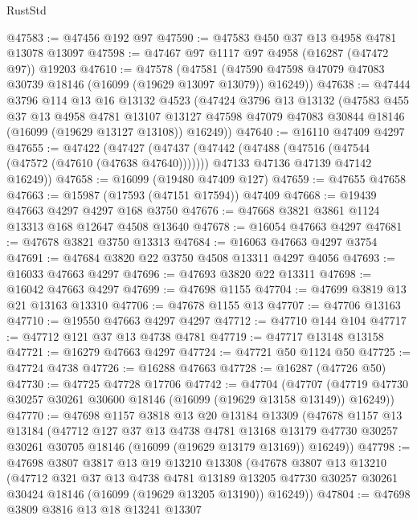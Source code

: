 \begin{lexlean}{RustStd}
\begin{coremodule}
@47583 := @47456 @192 @97
@47590 := @47583 @450 @37 @13 @4958 @4781 @13078 @13097
@47598 := @47467 @97 @1117 @97 @4958 (@16287 (@47472 @97)) @19203
@47610 := @47578
    (@47581 (@47590 @47598 @47079 @47083 @30739 @18146 (@16099 (@19629 @13097 @13079)) @16249))
@47638 := @47444
    @3796
    @114
    @13
    @16
    @13132
    @4523
    (@47424
      @3796
      @13
      @13132
      (@47583
        @455
        @37
        @13
        @4958
        @4781
        @13107
        @13127
        @47598
        @47079
        @47083
        @30844
        @18146
        (@16099 (@19629 @13127 @13108))
        @16249))
@47640 := @16110 @47409 @4297
@47655 := @47422
    (@47427
      (@47437
        (@47442 (@47488 (@47516 (@47544 (@47572 (@47610 (@47638 @47640)))))))
        @47133
        @47136
        @47139
        @47142
        @16249))
@47658 := @16099 (@19480 @47409 @127)
@47659 := @47655 @47658
@47663 := @15987 (@17593 (@47151 @17594)) @47409
@47668 := @19439 @47663 @4297 @4297 @168 @3750
@47676 := @47668 @3821 @3861 @1124 @13313 @168 @12647 @4508 @13640
@47678 := @16054 @47663 @4297
@47681 := @47678 @3821 @3750 @13313
@47684 := @16063 @47663 @4297 @3754
@47691 := @47684 @3820 @22 @3750 @4508 @13311 @4297 @4056
@47693 := @16033 @47663 @4297
@47696 := @47693 @3820 @22 @13311
@47698 := @16042 @47663 @4297
@47699 := @47698 @1155
@47704 := @47699 @3819 @13 @21 @13163 @13310
@47706 := @47678 @1155 @13
@47707 := @47706 @13163
@47710 := @19550 @47663 @4297 @4297
@47712 := @47710 @144 @104
@47717 := @47712 @121 @37 @13 @4738 @4781
@47719 := @47717 @13148 @13158
@47721 := @16279 @47663 @4297
@47724 := @47721 @50 @1124 @50
@47725 := @47724 @4738
@47726 := @16288 @47663
@47728 := @16287 (@47726 @50)
@47730 := @47725 @47728 @17706
@47742 := @47704
    (@47707 (@47719 @47730 @30257 @30261 @30600 @18146 (@16099 (@19629 @13158 @13149)) @16249))
@47770 := @47698
    @1157
    @3818
    @13
    @20
    @13184
    @13309
    (@47678
      @1157
      @13
      @13184
      (@47712
        @127
        @37
        @13
        @4738
        @4781
        @13168
        @13179
        @47730
        @30257
        @30261
        @30705
        @18146
        (@16099 (@19629 @13179 @13169))
        @16249))
@47798 := @47698
    @3807
    @3817
    @13
    @19
    @13210
    @13308
    (@47678
      @3807
      @13
      @13210
      (@47712
        @321
        @37
        @13
        @4738
        @4781
        @13189
        @13205
        @47730
        @30257
        @30261
        @30424
        @18146
        (@16099 (@19629 @13205 @13190))
        @16249))
@47804 := @47698 @3809 @3816 @13 @18 @13241 @13307

\end{coremodule}
\end{lexlean}
